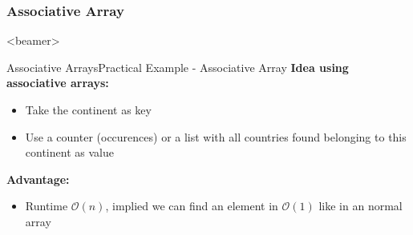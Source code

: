 \subsubsection{Associative Array}

\begin{frame}<beamer>{\LectureToC}
\end{frame}

\begin{frame}{Associative Arrays}{Practical Example - Associative Array}
  \textbf{Idea using associative arrays:}
  \begin{itemize}
    \item
      Take the continent as {\color{Mittel-Blau}key}
    \item
      Use a counter (occurences) or a list with all countries found belonging
      to this continent as {\color{Mittel-Blau}value}
  \end{itemize}
  \textbf{Advantage:}
  \begin{itemize}
    \item
      Runtime $\mathcal{O}(n)$, implied we can find an element in 
      $\mathcal{O}(1)$ like in an normal array
  \end{itemize}
\end{frame}





